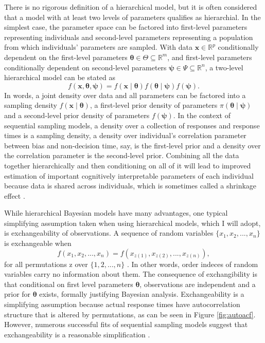 \documentclass[12pt]{report}
\begin{document}
There is no rigorous definition of a hierarchical model, but it is often considered that a model with at least two levels of parameters qualifies as hierarchial. In the simplest case, the parameter space can be factored
into first-level parameters representing individuals and
second-level parameters representing a population from which
individuals' parameters are sampled.  With data $\boldsymbol{x} \in \mathbb{R}^p$
conditionally dependent on the first-level parameters $\boldsymbol{\theta} \in \Theta
\subseteq \mathbb{R}^m$, and first-level parameters conditionally dependent on
second-level parameters $\boldsymbol{\psi} \in \Psi \subseteq \mathbb{R}^n$, a two-level
hierarchical model can be stated as
%
\begin{equation}
f(\boldsymbol{x}, \boldsymbol{\theta}, \boldsymbol{\psi}) =
f(\boldsymbol{x} \mid \boldsymbol{\theta})
f(\boldsymbol{\theta} \mid \boldsymbol{\psi})
f(\boldsymbol{\psi}).
\end{equation}
%
In words, a joint density over data and all parameters can be factored into a sampling density $f(\boldsymbol{x} \mid
\boldsymbol{\theta})$, a first-level prior density of parameters $\pi(\boldsymbol{\theta} \mid
\boldsymbol{\psi})$ and a second-level prior density of parameters $f(\boldsymbol{\psi})$. In the context of sequential sampling models, a density over a collection of responses and response times is a sampling density, a density over individual's correlation parameter between bias and non-decision time, say, is the first-level prior and a density over the correlation parameter is the second-level prior. Combining all the data together hierarchically and then conditioning on all of it will lead to improved estimation of important cognitively interpretable parameters of each individual because data is shared across individuals, which is sometimes called a shrinkage effect \citep{GelCar2013}.

While hierarchical Bayesian models have many advantages, one typical simplifying assumption taken when using hierarchical models, which I will adopt, is exchangeability of observations. A sequence of random variables $\{x_1, x_2, ..., x_n\}$ is exchangeable when 
\begin{equation}
f(x_1, x_2, ..., x_n) = f(x_{z(1)}, x_{z(2)}, ..., x_{z(n)}),
\end{equation}
for all permutations z over $\{1, 2, ...,n\}$ \citep{GelCar2013}. In other words, order indeces of random variables carry no information about them. The consequence of exchangibility is that conditional on first level parameters $\boldsymbol{\theta}$, observations are independent and a prior for $\boldsymbol{\theta}$ exists, formally justifying Bayesian analysis. Exchangeability is a simplifying assumption because actual response times have autocorrelation structure that is altered by permutations, as can be seen in Figure \ref{fig:autoacf}. However, numerous successful fits of sequential sampling models suggest that exchangeability is a reasonable simplification \citep{UshMcc2001,RatSmi2004,RatMck2008}.
\end{document}
